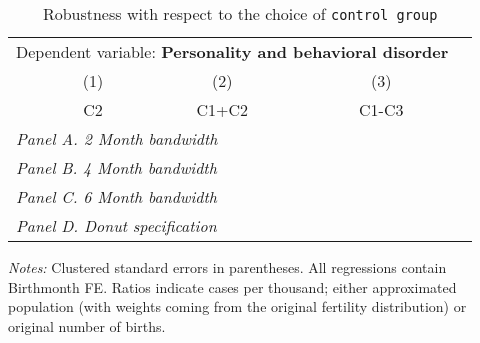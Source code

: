  \begin{table}[H] \begin{threeparttable} \centering \caption{Robustness with respect to the choice of \texttt{control group}} {\def\sym#1{\ifmmode^{#1}\else\(^{#1}\)\fi} \begin{tabular}{l*{4}{c}} \toprule \multicolumn{4}{c}{Dependent variable: \textbf{Personality and behavioral disorder}} \\ \cmidrule(lr){2-4}
            &\multicolumn{1}{c}{(1)}&\multicolumn{1}{c}{(2)}&\multicolumn{1}{c}{(3)}\\
            &\multicolumn{1}{c}{C2}&\multicolumn{1}{c}{C1+C2}&\multicolumn{1}{c}{C1-C3}\\
\midrule
 \multicolumn{4}{l}{\emph{Panel A. 2 Month bandwidth}} \\    \midrule\multicolumn{4}{l}{\emph{Panel B. 4 Month bandwidth}} \\    \midrule\multicolumn{4}{l}{\emph{Panel C. 6 Month bandwidth}} \\    \midrule\multicolumn{4}{l}{\emph{Panel D. Donut specification}} \\    
\bottomrule \end{tabular} } \begin{tablenotes} \item \scriptsize \emph{Notes:} Clustered standard errors in parentheses. All regressions contain Birthmonth FE. Ratios indicate cases per thousand; either approximated population (with weights coming from the original fertility distribution) or original number of births. \end{tablenotes} \end{threeparttable} \end{table} 
